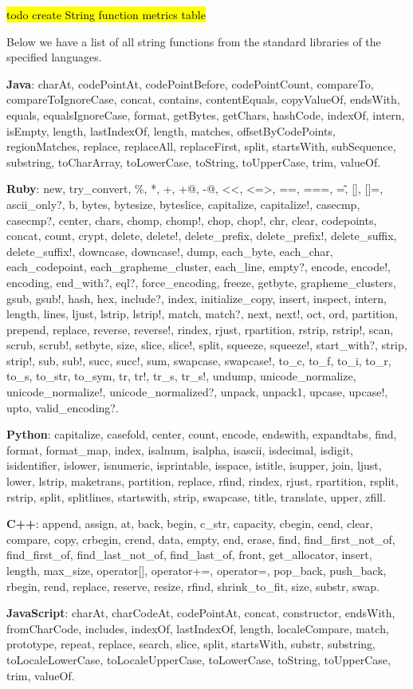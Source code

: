 \documentclass[anonymous,sigplan,review,11pt,nonacm,natbib=false]{acmart}
\begin{document}
    \hl{todo create String function metrics table}

    Below we have a list of all string functions from the standard libraries of the specified languages.

    \textbf{Java}: charAt, codePointAt, codePointBefore, codePointCount, compareTo, compareToIgnoreCase, concat, contains, contentEquals, copyValueOf, endsWith, equals, equalsIgnoreCase, format, getBytes, getChars, hashCode, indexOf, intern, isEmpty, length, lastIndexOf, length, matches, offsetByCodePoints, regionMatches, replace, replaceAll, replaceFirst, split, startsWith, subSequence, substring, toCharArray, toLowerCase, toString, toUpperCase, trim, valueOf.

    \textbf{Ruby}: new, try\_convert, \%, *, +, +@, -@, <<, <=>, ==, ===, =\~, [], []=, ascii\_only?, b, bytes, bytesize, byteslice, capitalize, capitalize!, casecmp, casecmp?, center, chars, chomp, chomp!, chop, chop!, chr, clear, codepoints, concat, count, crypt, delete, delete!, delete\_prefix, delete\_prefix!, delete\_suffix, delete\_suffix!, downcase, downcase!, dump, each\_byte, each\_char, each\_codepoint, each\_grapheme\_cluster, each\_line, empty?, encode, encode!, encoding, end\_with?, eql?, force\_encoding, freeze, getbyte, grapheme\_clusters, gsub, gsub!, hash, hex, include?, index, initialize\_copy, insert, inspect, intern, length, lines, ljust, lstrip, lstrip!, match, match?, next, next!, oct, ord, partition, prepend, replace, reverse, reverse!, rindex, rjust, rpartition, rstrip, rstrip!, scan, scrub, scrub!, setbyte, size, slice, slice!, split, squeeze, squeeze!, start\_with?, strip, strip!, sub, sub!, succ, succ!, sum, swapcase, swapcase!, to\_c, to\_f, to\_i, to\_r, to\_s, to\_str, to\_sym, tr, tr!, tr\_s, tr\_s!, undump, unicode\_normalize, unicode\_normalize!, unicode\_normalized?, unpack, unpack1, upcase, upcase!, upto, valid\_encoding?.

    \textbf{Python}: capitalize, casefold, center, count, encode, endswith, expandtabs, find, format, format\_map, index, isalnum, isalpha, isascii, isdecimal, isdigit, isidentifier, islower, isnumeric, isprintable, isspace, istitle, isupper, join, ljust, lower, lstrip, maketrans, partition, replace, rfind, rindex, rjust, rpartition, rsplit, rstrip, split, splitlines, startswith, strip, swapcase, title, translate, upper, zfill.

    \textbf{C++}: append, assign, at, back, begin, c\_str, capacity, cbegin, cend, clear, compare, copy, crbegin, crend, data, empty, end, erase, find, find\_first\_not\_of, find\_first\_of, find\_last\_not\_of, find\_last\_of, front, get\_allocator, insert, length, max\_size, operator[], operator+=, operator=, pop\_back, push\_back, rbegin, rend, replace, reserve, resize, rfind, shrink\_to\_fit, size, substr, swap.

    \textbf{JavaScript}: charAt, charCodeAt, codePointAt, concat, constructor, endsWith, fromCharCode, includes, indexOf, lastIndexOf, length, localeCompare, match, prototype, repeat, replace, search, slice, split, startsWith, substr, substring, toLocaleLowerCase, toLocaleUpperCase, toLowerCase, toString, toUpperCase, trim, valueOf.

    \printbibliography
\end{document}

